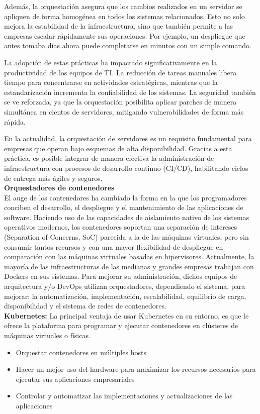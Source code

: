 \documentclass[12pt,letterpaper]{article}
\begin{document}
Además, la orquestación asegura que los cambios realizados en un servidor se apliquen de forma homogénea en todos los sistemas relacionados. Esto no solo mejora la estabilidad de la infraestructura, sino que también permite a las empresas escalar rápidamente sus operaciones. Por ejemplo, un despliegue que antes tomaba días ahora puede completarse en minutos con un simple comando. 

La adopción de estas prácticas ha impactado significativamente en la productividad de los equipos de TI. La reducción de tareas manuales libera tiempo para concentrarse en actividades estratégicas, mientras que la estandarización incrementa la confiabilidad de los sistemas. La seguridad también se ve reforzada, ya que la orquestación posibilita aplicar parches de manera simultánea en cientos de servidores, mitigando vulnerabilidades de forma más rápida. 

En la actualidad, la orquestación de servidores es un requisito fundamental para empresas que operan bajo esquemas de alta disponibilidad. Gracias a esta práctica, es posible integrar de manera efectiva la administración de infraestructura con procesos de desarrollo continuo (CI/CD), habilitando ciclos de entrega más ágiles y seguros. \\

\textbf{Orquestadores de contenedores} \\
El auge de los contenedores ha cambiado la forma en la que los programadores conciben el desarrollo, el despliegue y el mantenimiento de las aplicaciones de software. Haciendo uso de las capacidades de aislamiento nativo de los sistemas operativos modernos, los contenedores soportan una separación de intereses (Separation of Concerns, SoC) parecida a la de las máquinas virtuales, pero sin consumir tantos recursos y con una mayor flexibilidad de despliegue en comparación con las máquinas virtuales basadas en hipervisores.
Actualmente, la mayoría de las infraestructuras de las medianas y grandes empresas trabajan con Dockers en sus sistemas. Para mejorar su administración, dichos equipos de arquitectura y/o DevOps utilizan orquestadores, dependiendo el sistema, para mejorar: la automatización, implementación, escalabilidad, equilibrio de carga, disponibilidad y el sistema de redes de contenedores.\\

\textbf{Kubernetes:} La principal ventaja de usar Kubernetes en su entorno, es que le ofrece la plataforma para programar y ejecutar contenedores en clústeres de máquinas virtuales o físicas.
\begin{itemize}
    \item Orquestar contenedores en múltiples hosts
\end{itemize}
\begin{itemize}
    \item Hacer un mejor uso del hardware para maximizar los recursos necesarios para ejecutar sus aplicaciones empresariales
\end{itemize}
\begin{itemize}
    \item Controlar y automatizar las implementaciones y actualizaciones de las aplicaciones
\end{itemize}
\end{document}
